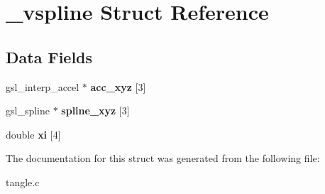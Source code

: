 \hypertarget{struct__vspline}{}\section{\+\_\+vspline Struct Reference}
\label{struct__vspline}
\subsection*{Data Fields}
\begin{DoxyCompactItemize}
\item 
gsl\+\_\+interp\+\_\+accel $\ast$ {\bfseries acc\+\_\+xyz} \mbox{[}3\mbox{]}\hypertarget{struct__vspline_ae4951d2db2c032f133d2de85c7f67a7a}{}\label{struct__vspline_ae4951d2db2c032f133d2de85c7f67a7a}

\item 
gsl\+\_\+spline $\ast$ {\bfseries spline\+\_\+xyz} \mbox{[}3\mbox{]}\hypertarget{struct__vspline_a052073b7b872461d6e156a175fe40f22}{}\label{struct__vspline_a052073b7b872461d6e156a175fe40f22}

\item 
double {\bfseries xi} \mbox{[}4\mbox{]}\hypertarget{struct__vspline_a834c25aab00f915e7f6d3d6df859388a}{}\label{struct__vspline_a834c25aab00f915e7f6d3d6df859388a}

\end{DoxyCompactItemize}


The documentation for this struct was generated from the following file\+:\begin{DoxyCompactItemize}
\item 
tangle.\+c\end{DoxyCompactItemize}
